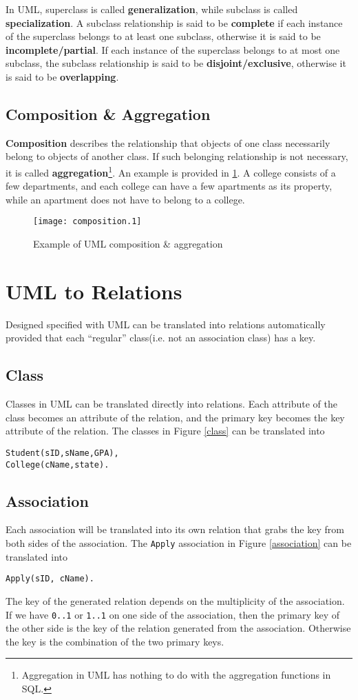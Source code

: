 In UML, superclass is called \textbf{generalization}, while subclass is called \textbf{specialization}. A subclass relationship is said to be \textbf{complete} if each instance of the superclass belongs to at least one subclass, otherwise it is said to be \textbf{incomplete/partial}. If each instance of the superclass belongs to at most one subclass, the subclass relationship is said to be \textbf{disjoint/exclusive}, otherwise it is said to be \textbf{overlapping}.
\subsection{Composition \& Aggregation}
\textbf{Composition} describes the relationship that objects of one class necessarily belong to objects of another class. If such belonging relationship is not necessary, it is called \textbf{aggregation}\footnote{Aggregation in UML has nothing to do with the aggregation functions in SQL.}. An example is provided in \ref{composition}. A college consists of a few departments, and each college can have a few apartments as its property, while an apartment does not have to belong to a college.
\begin{figure}[ht]
\centering
\texttt{[image: composition.1]}
\caption{Example of UML composition \& aggregation}\label{composition}
\end{figure}
\section{UML to Relations}
Designed specified with UML can be translated into relations automatically provided that each ``regular'' class(i.e. not an association class) has a key. 
\subsection{Class}
Classes in UML can be translated directly into relations. Each attribute of the class becomes an attribute of the relation, and the primary key becomes the key attribute of the relation. The classes in Figure \ref{class} can be translated into 
\begin{lstlisting}
Student(sID,sName,GPA),
College(cName,state).
\end{lstlisting}
\subsection{Association}
Each association will be translated into its own relation that grabs the key from both sides of the association. The \texttt{Apply} association in Figure \ref{association} can be translated into 
\begin{lstlisting}
Apply(sID, cName).
\end{lstlisting}
The key of the generated relation depends on the multiplicity of the association. If we have \texttt{0..1} or \texttt{1..1} on one side of the association, then the primary key of the other side is the key of the relation generated from the association. Otherwise the key is the combination of the two primary keys.

